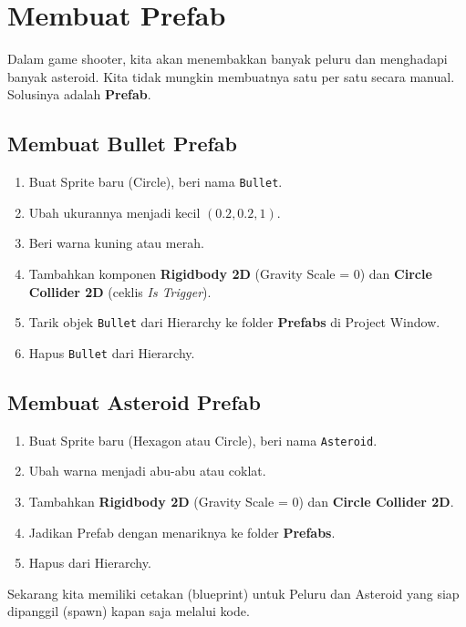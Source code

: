 
\section{Membuat Prefab}

Dalam game shooter, kita akan menembakkan banyak peluru dan menghadapi banyak asteroid. Kita tidak mungkin membuatnya satu per satu secara manual. Solusinya adalah \textbf{Prefab}.

\subsection{Membuat Bullet Prefab}

\begin{enumerate}
    \item Buat Sprite baru (Circle), beri nama \texttt{Bullet}.
    \item Ubah ukurannya menjadi kecil $(0.2, 0.2, 1)$.
    \item Beri warna kuning atau merah.
    \item Tambahkan komponen \textbf{Rigidbody 2D} (Gravity Scale = 0) dan \textbf{Circle Collider 2D} (ceklis \textit{Is Trigger}).
    \item Tarik objek \texttt{Bullet} dari Hierarchy ke folder \textbf{Prefabs} di Project Window.
    \item Hapus \texttt{Bullet} dari Hierarchy.
\end{enumerate}

\subsection{Membuat Asteroid Prefab}

\begin{enumerate}
    \item Buat Sprite baru (Hexagon atau Circle), beri nama \texttt{Asteroid}.
    \item Ubah warna menjadi abu-abu atau coklat.
    \item Tambahkan \textbf{Rigidbody 2D} (Gravity Scale = 0) dan \textbf{Circle Collider 2D}.
    \item Jadikan Prefab dengan menariknya ke folder \textbf{Prefabs}.
    \item Hapus dari Hierarchy.
\end{enumerate}

Sekarang kita memiliki cetakan (blueprint) untuk Peluru dan Asteroid yang siap dipanggil (spawn) kapan saja melalui kode.
